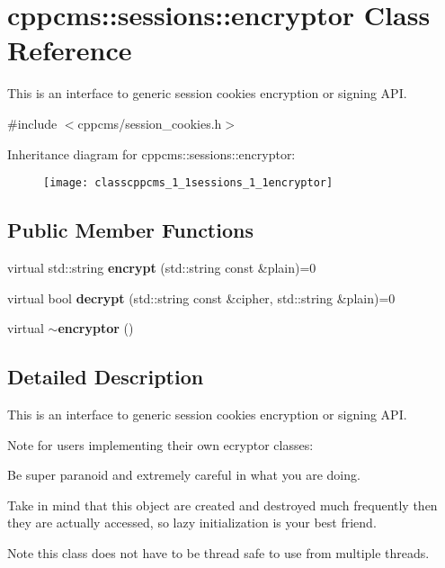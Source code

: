 \section{cppcms\-:\-:sessions\-:\-:encryptor Class Reference}
\label{classcppcms_1_1sessions_1_1encryptor}


This is an interface to generic session cookies encryption or signing A\-P\-I.  




{\ttfamily \#include $<$cppcms/session\-\_\-cookies.\-h$>$}

Inheritance diagram for cppcms\-:\-:sessions\-:\-:encryptor\-:\begin{figure}[H]
\begin{center}
\leavevmode
\texttt{[image: classcppcms\_1\_1sessions\_1\_1encryptor]}
\end{center}
\end{figure}
\subsection*{Public Member Functions}
\begin{DoxyCompactItemize}
\item 
virtual std\-::string {\bf encrypt} (std\-::string const \&plain)=0
\item 
virtual bool {\bf decrypt} (std\-::string const \&cipher, std\-::string \&plain)=0
\item 
virtual {\bf $\sim$encryptor} ()
\end{DoxyCompactItemize}


\subsection{Detailed Description}
This is an interface to generic session cookies encryption or signing A\-P\-I. 

Note for users implementing their own ecryptor classes\-:


\begin{DoxyItemize}
\item Be super paranoid and extremely careful in what you are doing.
\item Take in mind that this object are created and destroyed much frequently then they are actually accessed, so lazy initialization is your best friend.
\end{DoxyItemize}

Note this class does not have to be thread safe to use from multiple threads. 

